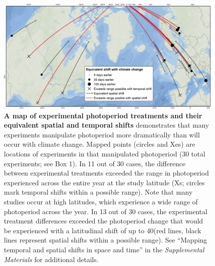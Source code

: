 \documentclass{article}
\begin{document}
\begin{figure}[h]
\centering
\includegraphics{..//..//analyses/photoperiod/figures/ospree_photopmap_fromblake.jpg} 
\caption{\textbf{A map of experimental photoperiod treatments and their equivalent spatial and temporal shifts} demonstrates that many experiments manipulate photoperiod more dramatically than will occur with climate change. Mapped points (circles and Xes) are locations of experiments in \citet{wolkovich2019} that manipulated photoperiod (30 total experiments; see Box 1). In 11 out of 30 cases, the difference between experimental treatments exceeded the range in photoperiod experienced across the entire year at the study latitude (Xs; circles mark temporal shifts within a possible range). Note that many studies occur at high latitudes, which experience a wide range of photoperiod across the year. In 13 out of 30 cases, the experimental treatment differences exceeded the photoperiod change that would be experienced with a latitudinal shift of up to 40\degree (red lines, black lines represent spatial shifts within a possible range). See ``Mapping temporal and spatial shifts in space and time'' in the \emph{Supplemental Materials} for additional details. }
 \label{fig:photomap}
 \end{figure}
\end{document}

